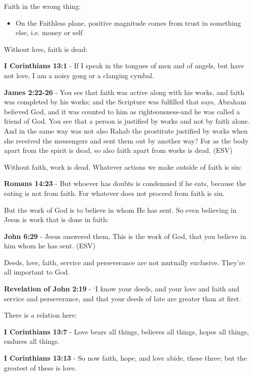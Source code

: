 \documentclass[11pt]{article}
\begin{document}
Faith in the wrong thing:
\begin{itemize}
\item On the Faithless plane, positive magnitude comes from trust in something else, i.e. money or self
\end{itemize}

Without love, faith is dead:

\textbf{I Corinthians 13:1} - If I speak in the tongues of men and of angels, but have not love, I am a noisy gong or a clanging cymbal.

\textbf{James 2:22-26} - You see that faith was active along with his works, and faith was completed by his works; and the Scripture was fulfilled that says, Abraham believed God, and it was counted to him as righteousness-and he was called a friend of God. You see that a person is justified by works and not by faith alone. And in the same way was not also Rahab the prostitute justified by works when she received the messengers and sent them out by another way? For as the body apart from the spirit is dead, so also faith apart from works is dead. (ESV)

Without faith, work is dead. Whatever actions we make outside of faith is sin:

\textbf{Romans 14:23} - But whoever has doubts is condemned if he eats, because the eating is not from faith. For whatever does not proceed from faith is sin.

But the work of God is to believe in whom He has sent. So even believing in Jesus is work that is done in faith:

\textbf{John 6:29} - Jesus answered them, This is the work of God, that you believe in him whom he has sent. (ESV)

Deeds, love, faith, service and perseverance are not mutually exclusive. They're all important to God.

\textbf{Revelation of John 2:19} - ‘I know your deeds, and your love and faith and service and perseverance, and that your deeds of late are greater than at first.

There is a relation here:

\textbf{I Corinthians 13:7} - Love bears all things, believes all things, hopes all things, endures all things.

\textbf{I Corinthians 13:13} - So now faith, hope, and love abide, these three; but the greatest of these is love.
\end{document}
